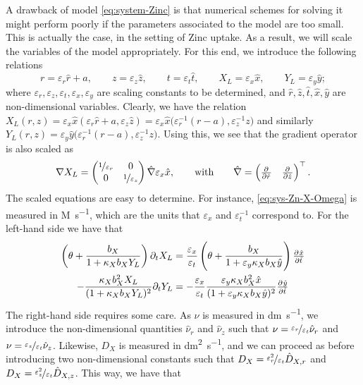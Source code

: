 \documentclass[11pt]{article}
\numberwithin{equation}{section}
\begin{document}
A drawback of model \eqref{eq:system-Zinc} is that numerical schemes for solving it might perform poorly if the parameters associated to the model are too small. This is actually the case, in the setting of Zinc uptake. As a result, we will scale the variables of the model appropriately. For this end, we introduce the following relations
\[
    r = \varepsilon_r \hat{r} + a,
    \qquad
    z = \varepsilon_z \hat{z},
    \qquad
    t = \varepsilon_t \hat{t},
    \qquad
    X_L = \varepsilon_x \hat{x},
    \qquad
    Y_L = \varepsilon_y \hat{y};
\]
where \( \varepsilon_r, \varepsilon_z, \varepsilon_t, \varepsilon_x, \varepsilon_y\) are scaling constants to be determined, and \(\hat{r}, \hat z, \hat t, \hat x, \hat y\) are non-dimensional variables.
Clearly, we have the relation \(X_L(r,z) = \varepsilon_x \hat{x} (\varepsilon_r \hat r + a, \varepsilon_z \hat z) = \varepsilon_x \hat{x} \big( \varepsilon_r^{-1} (r-a) , \varepsilon_z^{-1} z\big) \) and similarly \(Y_L (r,z) = \varepsilon_y \hat{y} \big( \varepsilon_r^{-1} (r-a), \varepsilon_z^{-1} z \big)\). Using this, we see that the gradient operator is also scaled as
\[
    \nabla X_L =
    \begin{pmatrix}
        \nicefrac{1}{\varepsilon_r} & 0 \\
        0 & \nicefrac{1}{\varepsilon_z}
    \end{pmatrix}
    \hat{\nabla} \varepsilon_x \hat{x},
    \qquad \text{with} \qquad
    \hat{\nabla} = 
    \begin{pmatrix}
        \pd{ }{\hat r}
        &
        \pd{ }{\hat z}
    \end{pmatrix}^\top .
\]
The scaled equations are easy to determine. For instance,  \eqref{eq:sys-Zn-X-Omega} is measured in \si{M.s^{-1}}, which are the units that \(\varepsilon_x\) and \(\varepsilon_t^{-1}\) correspond to. For the left-hand side we have that
\begin{align}
    \left( \theta + \frac{b_X}{1 + \kappa_X b_X Y_L} \right) \partial_t X_L &= \frac{\varepsilon_x}{\varepsilon_t} \left( \theta + \frac{b_X}{1 + \varepsilon_y \kappa_X b_X \hat{y}} \right)  \pd{\hat{x}}{\hat{t}}
    \\
    - \frac{\kappa_X b_X^2 X_L}{(1+\kappa_X b_X Y_L)^2} \partial_t Y_L &=
    -\frac{\varepsilon_x}{\varepsilon_t} \frac{\varepsilon_y \kappa_X b_X^2 \hat{x}}{(1+ \varepsilon_y\kappa_X b_X \hat{y})^2} \pd{\hat y}{\hat t}
\end{align}
The right-hand side requires some care. As \(\nu\) is measured in \si{dm.s^{-1}}, we introduce the non-dimensional quantities \( \hat{\nu}_r\) and \( \hat{\nu}_z\) such that \( \nu = \nicefrac{\varepsilon_r}{\varepsilon_t} \hat{\nu}_r \) and \( \nu = \nicefrac{\varepsilon_z}{\varepsilon_t} \hat{\nu}_z \). Likewise, \(D_X\) is measured in \si{dm^2.s^{-1}}, and we can proceed as before introducing two non-dimensional constants such that \(D_{X} = \nicefrac{\varepsilon_r^2}{\varepsilon_t} \hat{D}_{X,r}\) and \(D_{X} = \nicefrac{\varepsilon_z^2}{\varepsilon_t} \hat{D}_{X,z}\). This way, we have that
\end{document}
